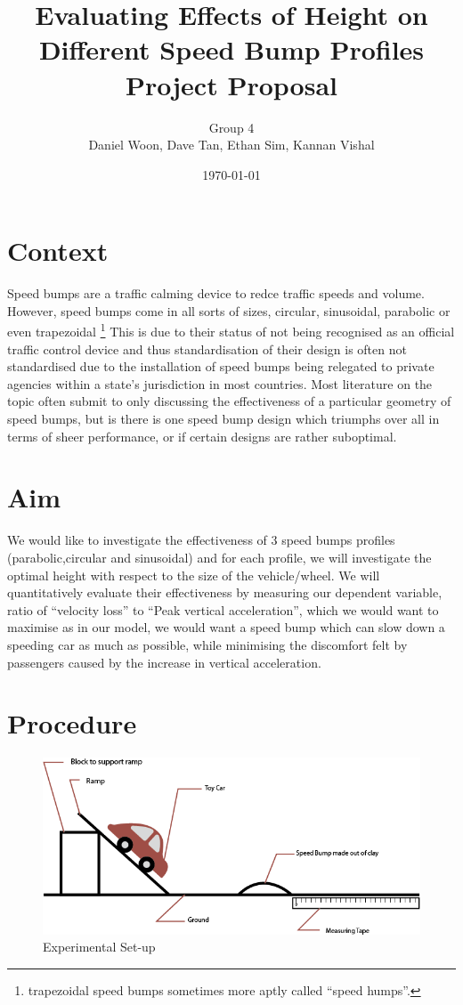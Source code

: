 \documentclass[11pt,a4paper]{article}
\title{Evaluating Effects of Height on Different Speed Bump Profiles Project Proposal}
\author{Group 4\\
    Daniel Woon, Dave Tan, Ethan Sim, Kannan Vishal \\
}
\date{\today}
\begin{document}
\maketitle

\section{Context}

Speed bumps are a traffic calming device to redce traffic speeds and
volume. However, speed bumps come in all sorts of sizes, circular, sinusoidal,
parabolic or even trapezoidal \footnote{trapezoidal speed bumps sometimes more
aptly called ``speed humps''.} This is due to their status of not being
recognised as an official traffic control device and thus standardisation of
their design is often not standardised due to the installation of speed bumps
being relegated to private agencies within a state's jurisdiction in most
countries. Most literature on the topic often submit to only discussing the
effectiveness of a particular geometry of speed bumps, but is there is one speed
bump design which triumphs over all in terms of sheer performance, or if certain
designs are rather suboptimal.
\section{Aim}

We would like to investigate the effectiveness of 3 speed bumps profiles
(parabolic,circular and sinusoidal) and for each profile, we will
investigate the optimal height with respect to the size of the vehicle/wheel. We
will quantitatively evaluate their effectiveness by measuring our dependent
variable, ratio of ``velocity loss'' to ``Peak vertical acceleration'', which we would
want to maximise as in our model, we would want a speed bump which can slow down
a speeding car as much as possible, while minimising the discomfort felt by
passengers caused by the increase in vertical acceleration.
\section{Procedure}
\begin{figure}[H]
    \centering
    \includegraphics[scale=0.41]{diag.png}
    \caption{Experimental Set-up}
    \label{fig:setup}
  \end{figure}
\end{document}
